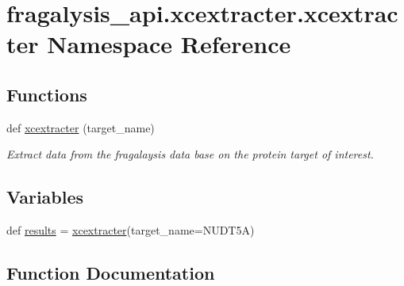 \hypertarget{namespacefragalysis__api_1_1xcextracter_1_1xcextracter}{}\section{fragalysis\+\_\+api.\+xcextracter.\+xcextracter Namespace Reference}
\label{namespacefragalysis__api_1_1xcextracter_1_1xcextracter}
\subsection*{Functions}
\begin{DoxyCompactItemize}
\item 
def \hyperlink{namespacefragalysis__api_1_1xcextracter_1_1xcextracter_a9aad6a3badcb479c966f153ce6b87126}{xcextracter} (target\+\_\+name)
\begin{DoxyCompactList}\small\item\em Extract data from the fragalaysis data base on the protein target of interest. \end{DoxyCompactList}\end{DoxyCompactItemize}
\subsection*{Variables}
\begin{DoxyCompactItemize}
\item 
def \hyperlink{namespacefragalysis__api_1_1xcextracter_1_1xcextracter_a72e0abb30ca031f003e991a2d76b1040}{results} = \hyperlink{namespacefragalysis__api_1_1xcextracter_1_1xcextracter_a9aad6a3badcb479c966f153ce6b87126}{xcextracter}(target\+\_\+name=\textquotesingle{}N\+U\+D\+T5A\textquotesingle{})
\end{DoxyCompactItemize}


\subsection{Function Documentation}
\mbox{\label{namespacefragalysis__api_1_1xcextracter_1_1xcextracter_a9aad6a3badcb479c966f153ce6b87126}} 
